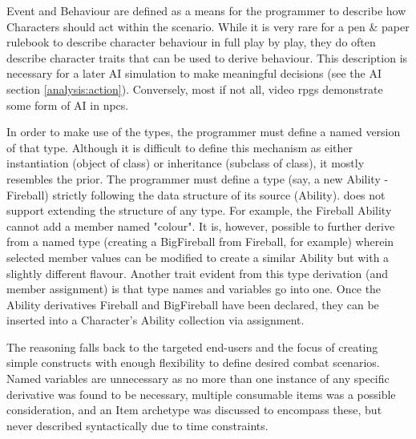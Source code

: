 Event and Behaviour are defined as a means for the programmer to describe how Characters should act within the scenario. While it is very rare for a pen \& paper rulebook to describe character behaviour in full play by play, they do often describe character traits that can be used to derive behaviour. This description is necessary for a later AI simulation to make meaningful decisions (see the AI section \vref{analysis:action}). %
Conversely, most if not all, video \ac{rpgs} demonstrate some form of AI in \ac{npc}s.

In order to make use of the types, the programmer must define a named version of that type. Although it is difficult to define this mechanism as either instantiation (object of class) or inheritance (subclass of class), it mostly resembles the prior. The programmer must define a type (say, a new Ability - Fireball) strictly following the data structure of its source (Ability). \langname{} does not support extending the structure of any type. For example, the Fireball Ability cannot add a member named "colour". It is, however, possible to further derive from a named type (creating a BigFireball from Fireball, for example) wherein selected member values can be modified to create a similar Ability but with a slightly different flavour. Another trait evident from this type derivation (and member assignment) is that type names and variables go into one. Once the Ability derivatives Fireball and BigFireball have been declared, they can be inserted into a Character's Ability collection via assignment.

The reasoning falls back to the targeted end-users and the focus of creating simple constructs with enough flexibility to define desired combat scenarios. Named variables are unnecessary as no more than one instance of any specific derivative was found to be necessary, multiple consumable items was a possible consideration, and an Item archetype was discussed to encompass these, but never described syntactically due to time constraints.
